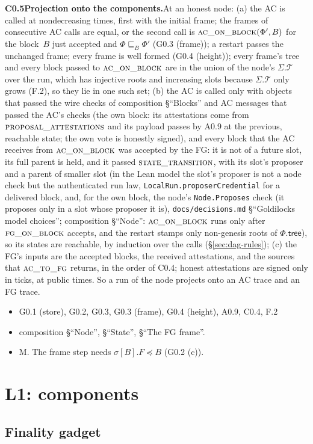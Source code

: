 \documentclass{article}
\newcommand{\T}{\mathcal T}
\newcommand{\Fr}{\Phi}
\newcommand{\fname}[1]{\text{\textsc{#1}}}
\newcommand{\dagnode}[6]{%
\par\medskip\noindent\textbf{#1\enspace #2.}\enspace #3
\begin{itemize}[leftmargin=2.2em,itemsep=0pt,topsep=2pt]
\item[\emph{Uses}] #4
\item[\emph{Evid.}] #5
\item[\emph{Task}] #6
\end{itemize}}
\begin{document}
\dagnode{C0.5}{Projection onto the components}{At an honest node: (a) the AC
is called at nondecreasing times, first with the initial frame; the frames of
consecutive AC calls are equal, or the second call is
$\fname{ac\_on\_block}(\Fr',B)$ for the block~$B$ just accepted and
$\Fr\sqsubseteq_B\Fr'$ (G0.3 (frame)); a restart passes the unchanged frame;
every frame is well formed (G0.4 (height)); every frame's tree and every block
passed to $\fname{ac\_on\_block}$ are in the union of the node's $\Sigma.\T$
over the run, which has injective roots and increasing slots because
$\Sigma.\T$ only grows (F.2), so they lie in one such set; (b) the AC is called only with
objects that passed the wire checks of composition \S``Blocks'' and AC
messages that passed the AC's checks (the own block: its attestations come
from $\fname{proposal\_attestations}$ and its payload passes by A0.9 at the
previous, reachable state; the own vote is honestly signed), and every block
that the AC receives from $\fname{ac\_on\_block}$ was accepted by the FG: it is
not of a future slot, its full parent is held, and it passed
$\fname{state\_transition}$, with its slot's proposer and a parent of smaller
slot (in the Lean model the slot's proposer is not a node check but the
authenticated run law, \texttt{LocalRun.proposerCredential} for a delivered
block, and, for the own block, the node's \texttt{Node.Proposes} check (it
proposes only in a slot whose proposer it is), \texttt{docs/decisions.md}
\S``Goldilocks model choices''; composition \S``Node'': $\fname{ac\_on\_block}$ runs only after
$\fname{fg\_on\_block}$ accepts, and the restart stamps only non-genesis roots of
$\Fr.\mathsf{tree}$), so its states are reachable, by induction over the calls
(\S\ref{sec:dag-rules}); (c) the FG's inputs are the accepted blocks, the
received attestations, and the sources that $\fname{ac\_to\_fg}$ returns, in the
order of C0.4; honest attestations are signed only in ticks, at public times.
So a run of the node projects onto an AC trace and an FG trace.}
{G0.1 (store), G0.2, G0.3, G0.3 (frame), G0.4 (height), A0.9, C0.4, F.2}{composition
\S``Node'', \S``State'', \S``The FG frame''.}{M.  The frame step needs
$\sigma[B].F\preceq B$ (G0.2 (c)).}

\section{L1: components}\label{sec:l1}

\subsection{Finality gadget}
\end{document}
